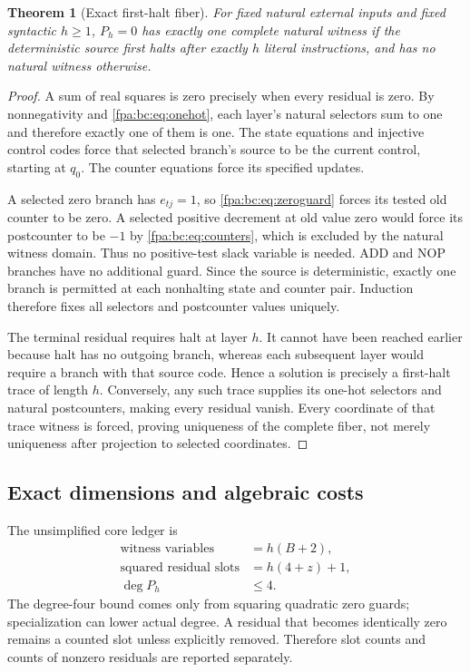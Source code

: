 \documentclass[11pt,a4paper]{article}
\numberwithin{equation}{section}
\newtheorem{theorem}{Theorem}[section]
\begin{document}
\begin{theorem}[Exact first-halt fiber]\label{fpa:bc:thm:fiber}
For fixed natural external inputs and fixed syntactic $h\ge1$, $P_h=0$ has
exactly one complete natural witness if the deterministic source first halts
after exactly $h$ literal instructions, and has no natural witness otherwise.
\end{theorem}
\begin{proof}
A sum of real squares is zero precisely when every residual is zero.
By nonnegativity and \eqref{fpa:bc:eq:onehot}, each layer's natural selectors sum to
one and therefore exactly one of them is one. The state equations and injective
control codes force that selected branch's source to be the current control,
starting at $q_0$. The counter equations force its specified updates.

A selected zero branch has $e_{tj}=1$, so \eqref{fpa:bc:eq:zeroguard} forces its tested
old counter to be zero. A selected positive decrement at old value zero would
force its postcounter to be $-1$ by \eqref{fpa:bc:eq:counters}, which is excluded by
the natural witness domain. Thus no positive-test slack variable is needed.
ADD and NOP branches have no additional guard. Since the source is deterministic,
exactly one branch is permitted at each nonhalting state and counter pair.
Induction therefore fixes all selectors and postcounter values uniquely.

The terminal residual requires halt at layer $h$. It cannot have been reached
earlier because halt has no outgoing branch, whereas each subsequent layer
would require a branch with that source code. Hence a solution is precisely a
first-halt trace of length $h$. Conversely, any such trace supplies its one-hot
selectors and natural postcounters, making every residual vanish. Every
coordinate of that trace witness is forced, proving uniqueness of the complete
fiber, not merely uniqueness after projection to selected coordinates.
\end{proof}

\subsection{Exact dimensions and algebraic costs}\label{fpa:bc:sec:algebracost}
The unsimplified core ledger is
\begin{equation}
 \begin{aligned}
 \text{witness variables}&=h(B+2),\\
 \text{squared residual slots}&=h(4+z)+1,\\
 \deg P_h&\le4.
 \end{aligned}\label{fpa:bc:eq:coreledger}
\end{equation}
The degree-four bound comes only from squaring quadratic zero guards;
specialization can lower actual degree. A residual that becomes identically
zero remains a counted slot unless explicitly removed. Therefore slot counts
and counts of nonzero residuals are reported separately.
\end{document}
